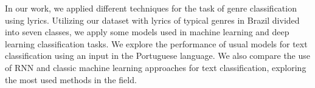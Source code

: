 In our work, we applied different techniques for the task of genre classification using lyrics. Utilizing our dataset with lyrics of typical genres in Brazil divided into seven classes, we apply some models used in machine learning and deep learning classification tasks. We explore the performance of usual models for text classification using an input in the Portuguese language. We also compare the use of RNN and classic machine learning approaches for text classification, exploring the most used methods in the field.
